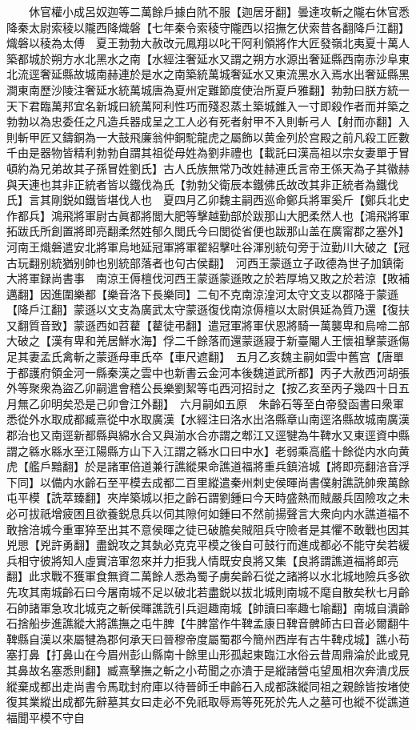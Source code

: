 　　休官權小成呂奴迦等二萬餘戶據白阬不服【迦居牙翻】曇達攻斬之隴右休官悉降秦太尉索稜以隴西降熾磐【七年秦令索稜守隴西以招撫乞伏索昔各翻降戶江翻】熾磐以稜為太傅　夏王勃勃大赦改元鳳翔以叱干阿利領將作大匠發嶺北夷夏十萬人築都城於朔方水北黑水之南【水經注奢延水又謂之朔方水源出奢延縣西南赤沙阜東北流逕奢延縣故城南赫連於是水之南築統萬城奢延水又東流黑水入焉水出奢延縣黑澗東南歷沙陵注奢延水統萬城唐為夏州定難節度使治所夏戶雅翻】勃勃曰朕方統一天下君臨萬邦宜名新城曰統萬阿利性巧而殘忍蒸土築城錐入一寸即殺作者而并築之勃勃以為忠委任之凡造兵器成呈之工人必有死者射甲不入則斬弓人【射而亦翻】入則斬甲匠又鑄銅為一大鼓飛廉翁仲銅駝龍虎之屬飾以黄金列於宫殿之前凡殺工匠數千由是器物皆精利勃勃自謂其祖從母姓為劉非禮也【載託曰漢高祖以宗女妻單于冒頓約為兄弟故其子孫冒姓劉氏】古人氏族無常乃改姓赫連氏言帝王係天為子其徽赫與天連也其非正統者皆以鐵伐為氏【勃勃父衛辰本鐵佛氏故改其非正統者為鐵伐氏】言其剛鋭如鐵皆堪伐人也　夏四月乙卯魏主嗣西巡命鄭兵將軍奚斤【鄭兵北史作都兵】鴻飛將軍尉古眞都將閭大肥等擊越勤部於跋那山大肥柔然人也【鴻飛將軍拓跋氏所創置將即亮翻柔然姓郁久閭氏今曰閭從省便也跋那山盖在廣甯郡之塞外】　河南王熾磐遣安北將軍烏地延冠軍將軍翟紹擊吐谷渾别統句旁于泣勤川大破之【冠古玩翻别統猶别帥也别統部落者也句古侯翻】　河西王蒙遜立子政德為世子加鎮衛大將軍録尚書事　南涼王傉檀伐河西王蒙遜蒙遜敗之於若厚塢又敗之於若涼【敗補邁翻】因進圍樂都【樂音洛下長樂同】二旬不克南涼湟河太守文支以郡降于蒙遜【降戶江翻】蒙遜以文支為廣武太守蒙遜復伐南涼傉檀以太尉俱延為質乃還【復扶又翻質音致】蒙遜西如苕藋【藋徒弔翻】遣冠軍將軍伏恩將騎一萬襲卑和烏啼二部大破之【漢有卑和羌居鮮水海】俘二千餘落而還蒙遜寢于新臺閹人王懷祖擊蒙遜傷足其妻孟氏禽斬之蒙遜母車氏卒【車尺遮翻】　五月乙亥魏主嗣如雲中舊宫【唐單于都護府領金河一縣秦漢之雲中也新書云金河本後魏道武所都】丙子大赦西河胡張外等聚衆為盜乙卯嗣遣會稽公長樂劉絜等屯西河招討之【按乙亥至丙子幾四十日五月無乙卯明矣恐是己卯會江外翻】　六月嗣如五原　朱齡石等至白帝發函書曰衆軍悉從外水取成都臧熹從中水取廣漢【水經注曰洛水出洛縣章山南逕洛縣故城南廣漢郡治也又南逕新都縣與綿水合又與湔水合亦謂之郫江又逕犍為牛鞞水又東逕資中縣謂之緜水緜水至江陽縣方山下入江謂之緜水口曰中水】老弱乘高艦十餘從内水向黄虎【艦戶黯翻】於是諸軍倍道兼行譙縱果命譙道福將重兵鎮涪城【將即亮翻涪音浮下同】以備内水齡石至平模去成都二百里縱遣秦州刺史侯暉尚書僕射譙詵帥衆萬餘屯平模【詵萃臻翻】夾岸築城以拒之齡石謂劉鍾曰今天時盛熱而賊嚴兵固險攻之未必可拔祇增疲困且欲養鋭息兵以伺其隙何如鍾曰不然前揚聲言大衆向内水譙道福不敢捨涪城今重軍猝至出其不意侯暉之徒已破膽矣賊阻兵守險者是其懼不敢戰也因其兇愳【兇許勇翻】盡銳攻之其埶必克克平模之後自可鼓行而進成都必不能守矣若緩兵相守彼將知人虛實涪軍忽來并力拒我人情既安良將又集【良將謂譙道福將郎亮翻】此求戰不獲軍食無資二萬餘人悉為蜀子虜矣齡石從之諸將以水北城地險兵多欲先攻其南城齡石曰今屠南城不足以破北若盡鋭以拔北城則南城不麾自散矣秋七月齡石帥諸軍急攻北城克之斬侯暉譙詵引兵迴趣南城【帥讀曰率趣七喻翻】南城自潰齡石捨船步進譙縱大將譙撫之屯牛脾【牛脾當作牛鞞孟康日鞞音髀師古曰音必爾翻牛鞞縣自漢以來屬犍為郡何承天曰晉穆帝度屬蜀郡今簡州西岸有古牛鞞戍城】譙小苟塞打鼻【打鼻山在今眉州彭山縣南十餘里山形孤起東臨江水俗云昔周鼎淪於此或見其鼻故名塞悉則翻】臧熹擊撫之斬之小苟聞之亦潰于是縱諸營屯望風相次奔潰戊辰縱棄成都出走尚書令馬耽封府庫以待晉師壬申齡石入成都誅縱同祖之親餘皆按堵使復其業縱出成都先辭墓其女曰走必不免祇取辱焉等死死於先人之墓可也縱不從譙道福聞平模不守自
